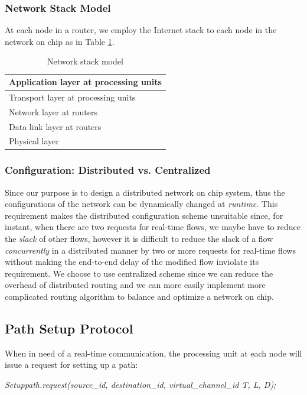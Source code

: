 \documentclass[conference, twocolumn]{IEEEtran}
\theoremstyle{definition}
\begin{document}
\subsubsection{Network Stack Model}
At each node in a router, we employ the Internet stack to each node in the 
network on chip as in Table \ref{table:NetworkStack}.
\begin{table}[h]
\begin{center}
  \begin{tabular}{ | l | }
    \hline
    Application layer at processing units \\ \hline
    Transport layer at processing units \\ \hline
    Network layer at routers \\ \hline
	Data link layer at routers \\ \hline
	Physical layer \\
    \hline
  \end{tabular}
\end{center}
\caption{Network stack model}
\label{table:NetworkStack}
\end{table}

\subsubsection{Configuration: Distributed vs. Centralized}
Since our purpose is to design a distributed network on chip system, thus the
configurations of the network can be dynamically changed at {\em runtime}.
This requirement makes the distributed configuration scheme unsuitable since,
for instant, when there are two requests for real-time flows, we maybe have to
reduce the {\em slack} of other flows, however it is difficult to reduce the
slack of a flow {\em concurrently} in a distributed manner by two or more
requests for real-time flows without making the end-to-end delay of the
modified flow inviolate its requirement. We choose to use centralized scheme
since we can reduce the overhead of distributed routing and we can more easily
implement more complicated routing algorithm to balance and optimize a network
on chip.

\subsection{Path Setup Protocol}
When in need of a real-time communication, the processing unit at each node 
will issue a request for setting up a path:

{\em Setuppath.request(source\_id, destination\_id, virtual\_channel\_id T, L,
D);}
\end{document}

